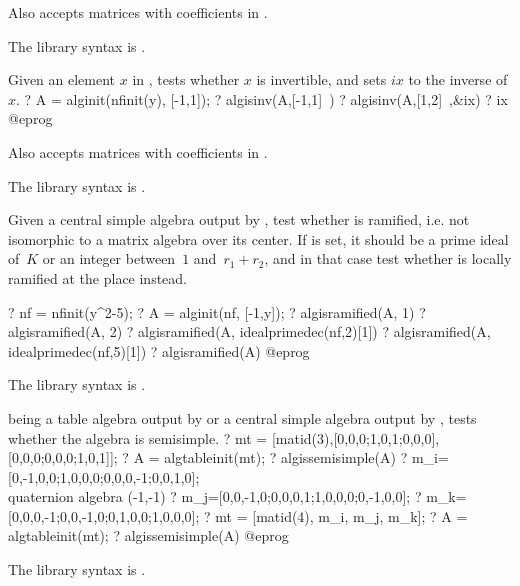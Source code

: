 Also accepts matrices with coefficients in .

The library syntax is .

\label{se:algisinv}
Given an element $x$ in , tests whether $x$ is invertible, and sets
$ix$ to the inverse of $x$.
\bprog
? A = alginit(nfinit(y), [-1,1]);
? algisinv(A,[-1,1]~)
? algisinv(A,[1,2]~,&ix)
? ix
@eprog

Also accepts matrices with coefficients in .

The library syntax is .

\label{se:algisramified}
Given a central simple algebra  output by , test
whether  is ramified, i.e. not isomorphic to a matrix algebra over its
center. If  is set, it should be a prime ideal of~$K$ or an integer
between~$1$ and~$r_1+r_2$, and in that case test whether  is locally
ramified at the place  instead.

\bprog
? nf = nfinit(y^2-5);
? A = alginit(nf, [-1,y]);
? algisramified(A, 1)
? algisramified(A, 2)
? algisramified(A, idealprimedec(nf,2)[1])
? algisramified(A, idealprimedec(nf,5)[1])
? algisramified(A)
@eprog

The library syntax is .

\label{se:algissemisimple}
 being a table algebra output by  or a central
simple algebra output by , tests whether the algebra  is
semisimple.
\bprog
? mt = [matid(3),[0,0,0;1,0,1;0,0,0],[0,0,0;0,0,0;1,0,1]];
? A = algtableinit(mt);
? algissemisimple(A)
? m_i=[0,-1,0,0;1,0,0,0;0,0,0,-1;0,0,1,0]; \\ quaternion algebra (-1,-1)
? m_j=[0,0,-1,0;0,0,0,1;1,0,0,0;0,-1,0,0];
? m_k=[0,0,0,-1;0,0,-1,0;0,1,0,0;1,0,0,0];
? mt = [matid(4), m_i, m_j, m_k];
? A = algtableinit(mt);
? algissemisimple(A)
@eprog

The library syntax is .

